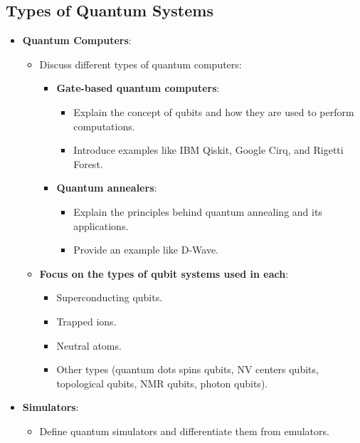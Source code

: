 \subsection{Types of Quantum Systems}
\begin{itemize}
    \item \textbf{Quantum Computers}:
        \begin{itemize}
            \item Discuss different types of quantum computers:
                \begin{itemize}
                    \item \textbf{Gate-based quantum computers}: 
                        \begin{itemize}
                            \item Explain the concept of qubits and how they are used to perform computations.
                            \item Introduce examples like IBM Qiskit, Google Cirq, and Rigetti Forest.
                        \end{itemize}
                    \item \textbf{Quantum annealers}:
                        \begin{itemize}
                            \item Explain the principles behind quantum annealing and its applications.
                            \item Provide an example like D-Wave. 
                        \end{itemize}
                \end{itemize}
            \item \textbf{Focus on the types of qubit systems used in each}: 
                \begin{itemize}
                    \item Superconducting qubits.
                    \item Trapped ions.
                    \item Neutral atoms.
                    \item Other types (quantum dots spins qubits, NV centers qubits, topological qubits, NMR qubits, photon qubits).
                \end{itemize}
        \end{itemize}
    \item \textbf{Simulators}:
        \begin{itemize}
            \item Define quantum simulators and differentiate them from emulators.

\end{itemize}
\end{itemize}
